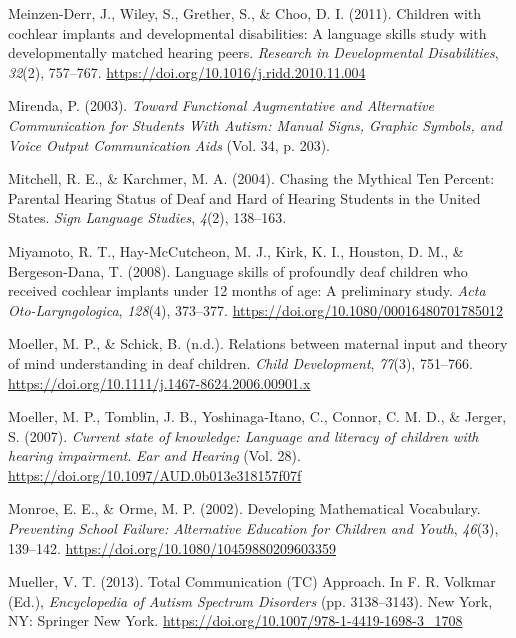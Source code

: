 \documentclass[english,man]{apa6}
\begin{document}
\leavevmode\hypertarget{ref-meinzen-derr2011}{}%
Meinzen-Derr, J., Wiley, S., Grether, S., \& Choo, D. I. (2011). Children with cochlear implants and developmental disabilities: A language skills study with developmentally matched hearing peers. \emph{Research in Developmental Disabilities}, \emph{32}(2), 757--767. \url{https://doi.org/10.1016/j.ridd.2010.11.004}

\leavevmode\hypertarget{ref-mirenda2003}{}%
Mirenda, P. (2003). \emph{Toward Functional Augmentative and Alternative Communication for Students With Autism: Manual Signs, Graphic Symbols, and Voice Output Communication Aids} (Vol. 34, p. 203).

\leavevmode\hypertarget{ref-mitchell2004}{}%
Mitchell, R. E., \& Karchmer, M. A. (2004). Chasing the Mythical Ten Percent: Parental Hearing Status of Deaf and Hard of Hearing Students in the United States. \emph{Sign Language Studies}, \emph{4}(2), 138--163.

\leavevmode\hypertarget{ref-miyamoto2008}{}%
Miyamoto, R. T., Hay-McCutcheon, M. J., Kirk, K. I., Houston, D. M., \& Bergeson-Dana, T. (2008). Language skills of profoundly deaf children who received cochlear implants under 12 months of age: A preliminary study. \emph{Acta Oto-Laryngologica}, \emph{128}(4), 373--377. \url{https://doi.org/10.1080/00016480701785012}

\leavevmode\hypertarget{ref-moeller2006}{}%
Moeller, M. P., \& Schick, B. (n.d.). Relations between maternal input and theory of mind understanding in deaf children. \emph{Child Development}, \emph{77}(3), 751--766. \url{https://doi.org/10.1111/j.1467-8624.2006.00901.x}

\leavevmode\hypertarget{ref-moeller2007}{}%
Moeller, M. P., Tomblin, J. B., Yoshinaga-Itano, C., Connor, C. M. D., \& Jerger, S. (2007). \emph{Current state of knowledge: Language and literacy of children with hearing impairment}. \emph{Ear and Hearing} (Vol. 28). \url{https://doi.org/10.1097/AUD.0b013e318157f07f}

\leavevmode\hypertarget{ref-monroe2002}{}%
Monroe, E. E., \& Orme, M. P. (2002). Developing Mathematical Vocabulary. \emph{Preventing School Failure: Alternative Education for Children and Youth}, \emph{46}(3), 139--142. \url{https://doi.org/10.1080/10459880209603359}

\leavevmode\hypertarget{ref-mueller2013}{}%
Mueller, V. T. (2013). Total Communication (TC) Approach. In F. R. Volkmar (Ed.), \emph{Encyclopedia of Autism Spectrum Disorders} (pp. 3138--3143). New York, NY: Springer New York. \url{https://doi.org/10.1007/978-1-4419-1698-3_1708}
\end{document}

